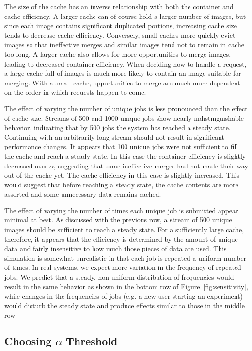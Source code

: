 \documentclass[sigconf]{acmart}
\begin{document}
The size of the cache has an inverse relationship with both the container and cache efficiency.
A larger cache can of course hold a larger number of images,
but since each image contains significant duplicated portions,
increasing cache size tends to decrease cache efficiency.
Conversely, small caches more quickly evict images so that ineffective merges and similar images tend not to remain in cache too long.
A larger cache also allows for more opportunities to merge images,
leading to decreased container efficiency.
When deciding how to handle a request,
a large cache full of images is much more likely to contain an image suitable for merging.
With a small cache, opportunities to merge are much more dependent on the order in which requests happen to come.

The effect of varying the number of unique jobs is less pronounced than the effect of cache size.
Streams of 500 and 1000 unique jobs show nearly indistinguishable behavior,
indicating that by 500 jobs the system has reached a steady state.
Continuing with an arbitrarily long stream should not result in significant performance changes.
It appears that 100 unique jobs were not sufficient to fill the cache and reach a steady state.
In this case the container efficiency is slightly decreased over $\alpha$,
suggesting that some ineffective merges had not made their way out of the cache yet.
The cache efficiency in this case is slightly increased.
This would suggest that before reaching a steady state,
the cache contents are more assorted and some unnecessary data remains cached.

The effect of varying the number of times each unique job is submitted appear minimal at best.
As discussed with the previous row,
a stream of 500 unique images should be sufficient to reach a steady state.
For a sufficiently large cache, therefore,
it appears that the efficiency is determined by the amount of unique data and fairly insensitive to how much those pieces of data are used.
This simulation is somewhat unrealistic in that each job is repeated a uniform number of times.
In real systems, we expect more variation in the frequency of repeated jobs.
We predict that a steady, non-uniform distribution of frequencies would result in the same behavior as shown in the bottom row of Figure~\ref{fig:sensitivity},
while changes in the frequencies of jobs (e.g. a new user starting an experiment)
would disturb the steady state and produce effects similar to those in the middle row.
    
\subsection{Choosing $\alpha$ Threshold}
\label{ANALYSIS_SECTION}
\end{document}
